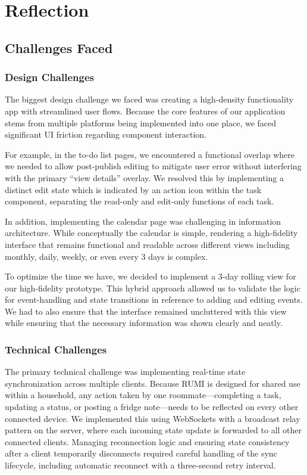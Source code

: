 \documentclass[sigconf]{acmart}
\begin{document}
\section{Reflection}

\subsection{Challenges Faced}

\subsubsection{Design Challenges}
The biggest design challenge we faced was creating a high-density functionality app with streamlined user flows. Because the core features of our application stems from multiple platforms being implemented into one place, we faced significant UI friction regarding component interaction.

For example, in the to-do list pages, we encountered a functional overlap where we needed to allow post-publish editing to mitigate user error without interfering with the primary ``view details'' overlay. We resolved this by implementing a distinct edit state which is indicated by an action icon within the task component, separating the read-only and edit-only functions of each task.

In addition, implementing the calendar page was challenging in information architecture. While conceptually the calendar is simple, rendering a high-fidelity interface that remains functional and readable across different views including monthly, daily, weekly, or even every 3 days is complex.

To optimize the time we have, we decided to implement a 3-day rolling view for our high-fidelity prototype. This hybrid approach allowed us to validate the logic for event-handling and state transitions in reference to adding and editing events. We had to also ensure that the interface remained uncluttered with this view while ensuring that the necessary information was shown clearly and neatly.

\subsubsection{Technical Challenges}
The primary technical challenge was implementing real-time state synchronization across multiple clients. Because RUMI is designed for shared use within a household, any action taken by one roommate---completing a task, updating a status, or posting a fridge note---needs to be reflected on every other connected device. We implemented this using WebSockets with a broadcast relay pattern on the server, where each incoming state update is forwarded to all other connected clients. Managing reconnection logic and ensuring state consistency after a client temporarily disconnects required careful handling of the sync lifecycle, including automatic reconnect with a three-second retry interval.
\end{document}
